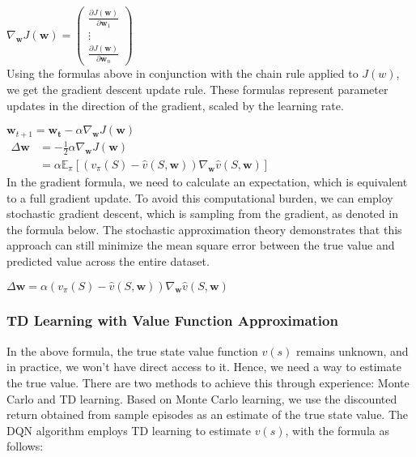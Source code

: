 \documentclass{article}
\begin{document}
$\nabla_{\mathbf{w}} J(\mathbf{w})=\left(\begin{array}{c}\frac{\partial J(\mathbf{w})}{\partial \mathbf{w}_1} \\ \vdots \\ \frac{\partial J(\mathbf{w})}{\partial \mathbf{w}_n}\end{array}\right)$\\

Using the formulas above in conjunction with the chain rule applied to $J(w)$, we get the gradient descent update rule. These formulas represent parameter updates in the direction of the gradient, scaled by the learning rate.

\hspace*{\fill}

$\mathbf{w}_{t+1}=\mathbf{w_t}-\alpha \nabla_\mathbf{w} J\left(\mathbf{w}\right)$\\

$\begin{aligned} \Delta \mathbf{w} & =-\frac{1}{2} \alpha \nabla_{\mathbf{w}} J(\mathbf{w}) \\ & =\alpha \mathbb{E}_\pi\left[\left(v_\pi(S)-\hat{v}(S, \mathbf{w})\right) \nabla_{\mathbf{w}} \hat{v}(S, \mathbf{w})\right]\end{aligned}$\\


In the gradient formula, we need to calculate an expectation, which is equivalent to a full gradient update. To avoid this computational burden, we can employ stochastic gradient descent, which is sampling from the gradient, as denoted in the formula below. The stochastic approximation theory demonstrates that this approach can still minimize the mean square error between the true value and predicted value across the entire dataset.

\hspace*{\fill}

$\Delta \mathbf{w}=\alpha\left(v_\pi(S)-\hat{v}(S, \mathbf{w})\right) \nabla_{\mathbf{w}} \hat{v}(S, \mathbf{w})$\\

\newpage
\subsubsection{TD Learning with Value Function Approximation}

In the above formula, the true state value function $v(s)$ remains unknown, and in practice, we won't have direct access to it. Hence, we need a way to estimate the true value. There are two methods to achieve this through experience: Monte Carlo and TD learning. Based on Monte Carlo learning, we use the discounted return obtained from sample episodes as an estimate of the true state value. The DQN algorithm employs TD learning to estimate $v(s)$, with the formula as follows:
\end{document}
